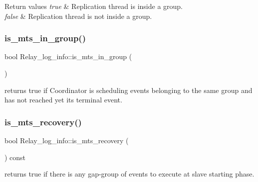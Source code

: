 \begin{DoxyRetVals}{Return values}
{\em true} & Replication thread is inside a group. \\
\hline
{\em false} & Replication thread is not inside a group. \\
\hline
\end{DoxyRetVals}
\mbox{\label{classRelay__log__info_ada979f23838e56bf348c48b31fd23c1e}} 
\subsubsection{\texorpdfstring{is\+\_\+mts\+\_\+in\+\_\+group()}{is\_mts\_in\_group()}}
{\footnotesize\ttfamily bool Relay\+\_\+log\+\_\+info\+::is\+\_\+mts\+\_\+in\+\_\+group (\begin{DoxyParamCaption}{ }\end{DoxyParamCaption})\hspace{0.3cm}{\ttfamily [inline]}}

returns true if Coordinator is scheduling events belonging to the same group and has not reached yet its terminal event. \mbox{\label{classRelay__log__info_a8a2b8efda6a02b8ba87c981f2e86bde1}} 
\subsubsection{\texorpdfstring{is\+\_\+mts\+\_\+recovery()}{is\_mts\_recovery()}}
{\footnotesize\ttfamily bool Relay\+\_\+log\+\_\+info\+::is\+\_\+mts\+\_\+recovery (\begin{DoxyParamCaption}{ }\end{DoxyParamCaption}) const\hspace{0.3cm}{\ttfamily [inline]}}

returns true if there is any gap-\/group of events to execute at slave starting phase. \mbox{\label{classRelay__log__info_adb9571ba13a628556e9d1cb86ebf9393}} 
